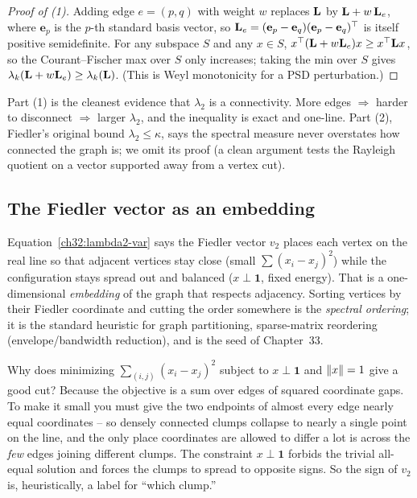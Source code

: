 \begin{proof}[Proof of (1)]
Adding edge $e=(p,q)$ with weight $w$ replaces $\mathbf{L}$ by $\mathbf{L} + w\,\mathbf{L}_e$, where $\mathbf{e}_p$ is the $p$-th standard basis vector, so $\mathbf{L}_e=(\mathbf{e}_p-\mathbf{e}_q)(\mathbf{e}_p-\mathbf{e}_q)^\top$ is itself positive semidefinite. For any subspace $S$ and any $x\in S$, $x^\top(\mathbf{L}+w\mathbf{L}_e)x\ge x^\top\mathbf{L} x$, so the Courant--Fischer max over $S$ only increases; taking the min over $S$ gives $\lambda_k(\mathbf{L}+w\mathbf{L}_e)\ge\lambda_k(\mathbf{L})$. (This is Weyl monotonicity for a PSD perturbation.)
\end{proof}

Part (1) is the cleanest evidence that $\lambda_2$ is a connectivity. More edges $\Rightarrow$ harder to disconnect $\Rightarrow$ larger $\lambda_2$, and the inequality is exact and one-line. Part (2), Fiedler's original bound $\lambda_2\le\kappa$, says the spectral measure never overstates how connected the graph is; we omit its proof (a clean argument tests the Rayleigh quotient on a vector supported away from a vertex cut).

\subsection{The Fiedler vector as an embedding}

Equation~\eqref{ch32:lambda2-var} says the Fiedler vector $v_2$ places each vertex on the real line so that adjacent vertices stay close (small $\sum(x_i-x_j)^2$) while the configuration stays spread out and balanced ($x\perp\mathbf 1$, fixed energy). That is a one-dimensional \emph{embedding} of the graph that respects adjacency. Sorting vertices by their Fiedler coordinate and cutting the order somewhere is the \emph{spectral ordering}; it is the standard heuristic for graph partitioning, sparse-matrix reordering (envelope/bandwidth reduction), and is the seed of Chapter~33.

\begin{whybox}
Why does minimizing $\sum_{(i,j)}(x_i-x_j)^2$ subject to $x\perp\mathbf1$ and $\lVert x\rVert=1$ give a good cut? Because the objective is a sum over edges of squared coordinate gaps. To make it small you must give the two endpoints of almost every edge nearly equal coordinates -- so densely connected clumps collapse to nearly a single point on the line, and the only place coordinates are allowed to differ a lot is across the \emph{few} edges joining different clumps. The constraint $x\perp\mathbf1$ forbids the trivial all-equal solution and forces the clumps to spread to opposite signs. So the sign of $v_2$ is, heuristically, a label for ``which clump.''
\end{whybox}

